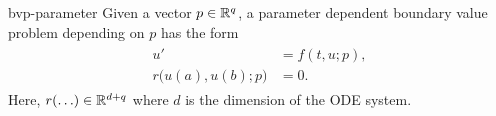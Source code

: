 \begin{Definition}{bvp-parameter}
  Given a vector $p\in \mathbb R^q$, a parameter dependent boundary value
  problem depending on $p$ has the form
  \begin{gather}
    \label{eq:bvp-parameter:1}
    \begin{split}
      u' &= f(t, u; p),\\
      r\bigl(u(a), u(b); p\bigr) &= 0.
    \end{split}
  \end{gather}
  Here, $r(\ldots) \in \mathbb R^{d+q}$ where $d$ is the dimension of the ODE system.
\end{Definition}

